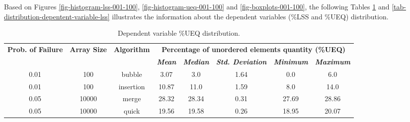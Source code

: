 Based on Figures \ref{fig-histogram-lss-001-100}, \ref{fig-histogram-ueq-001-100} and \ref{fig-boxplots-001-100}, the following Tables \ref{tab-distribution-depentent-variable-ueq} and \ref{tab-distribution-depentent-variable-lss} illustrates the information about the dependent variables (\%LSS and \%UEQ) distribution.

\begin{table}[H]
    \caption{Dependent variable \%UEQ distribution.}
    \begin{center}
    \begin{tabular}{|c|c|c|c|c|c|c|c|}
    \hline
    \textbf{Prob. of Failure} & \textbf{Array Size} & \textbf{Algorithm} & \multicolumn{5}{|c|}{\textbf{Percentage of unordered elements quantity (\%UEQ)}} \\
    \cline{4-8} 
    & & & \textbf{\textit{Mean}}& \textbf{\textit{Median}} & \textbf{\textit{Std. Deviation}} & \textbf{\textit{Minimum}} & \textbf{\textit{Maximum}} \\
    \hline
    0.01 & 100 & bubble & 3.07 & 3.0 & 1.64 & 0.0 & 6.0 \\
    \hline
    0.01 & 100 & insertion & 10.87 & 11.0 & 1.59 & 8.0 & 14.0 \\
    \hline
    0.05 & 10000 & merge & 28.32 & 28.34 & 0.31 & 27.69 & 28.86 \\
    \hline
    0.05 & 10000 & quick & 19.56 & 19.58 & 0.26 & 18.95 & 20.07 \\
    \hline
    \end{tabular}
    \label{tab-distribution-depentent-variable-ueq}
    \end{center}
\end{table}

